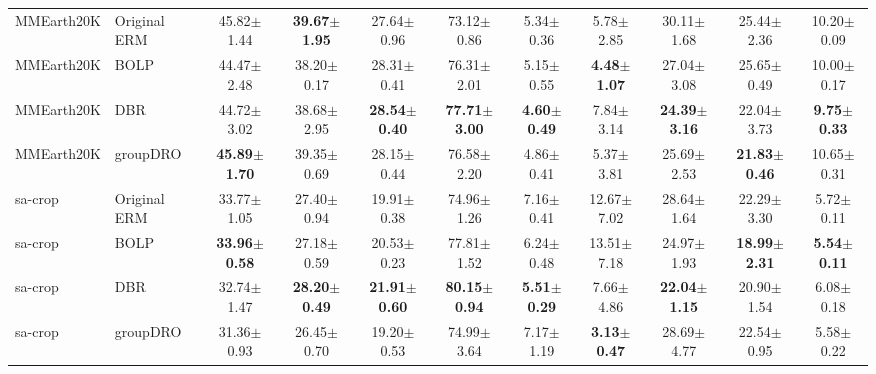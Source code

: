 \documentclass[11pt]{article}
\begin{document}
\begin{table}[h!]
{\begin{tabular}{llccccccccc}
MMEarth20K & Original ERM & 45.82$\pm$1.44 & \textbf{39.67$\pm$1.95} & 27.64$\pm$0.96 & 73.12$\pm$0.86 & 5.34$\pm$0.36 & 5.78$\pm$2.85 & 30.11$\pm$1.68 & 25.44$\pm$2.36 & 10.20$\pm$0.09 \\
MMEarth20K & BOLP & 44.47$\pm$2.48 & 38.20$\pm$0.17 & 28.31$\pm$0.41 & 76.31$\pm$2.01 & 5.15$\pm$0.55 & \textbf{4.48$\pm$1.07} & 27.04$\pm$3.08 & 25.65$\pm$0.49 & 10.00$\pm$0.17 \\
MMEarth20K & DBR & 44.72$\pm$3.02 & 38.68$\pm$2.95 & \textbf{28.54$\pm$0.40} & \textbf{77.71$\pm$3.00} & \textbf{4.60$\pm$0.49} & 7.84$\pm$3.14 & \textbf{24.39$\pm$3.16} & 22.04$\pm$3.73 & \textbf{9.75$\pm$0.33} \\
MMEarth20K & groupDRO & \textbf{45.89$\pm$1.70} & 39.35$\pm$0.69 & 28.15$\pm$0.44 & 76.58$\pm$2.20 & 4.86$\pm$0.41 & 5.37$\pm$3.81 & 25.69$\pm$2.53 & \textbf{21.83$\pm$0.46} & 10.65$\pm$0.31 \\
\midrule

sa-crop & Original ERM & 33.77$\pm$1.05 & 27.40$\pm$0.94 & 19.91$\pm$0.38 & 74.96$\pm$1.26 & 7.16$\pm$0.41 & 12.67$\pm$7.02 & 28.64$\pm$1.64 & 22.29$\pm$3.30 & 5.72$\pm$0.11 \\
sa-crop & BOLP & \textbf{33.96$\pm$0.58} & 27.18$\pm$0.59 & 20.53$\pm$0.23 & 77.81$\pm$1.52 & 6.24$\pm$0.48 & 13.51$\pm$7.18 & 24.97$\pm$1.93 & \textbf{18.99$\pm$2.31} & \textbf{5.54$\pm$0.11} \\
sa-crop & DBR & 32.74$\pm$1.47 & \textbf{28.20$\pm$0.49} & \textbf{21.91$\pm$0.60} & \textbf{80.15$\pm$0.94} & \textbf{5.51$\pm$0.29} & 7.66$\pm$4.86 & \textbf{22.04$\pm$1.15} & 20.90$\pm$1.54 & 6.08$\pm$0.18 \\
sa-crop & groupDRO & 31.36$\pm$0.93 & 26.45$\pm$0.70 & 19.20$\pm$0.53 & 74.99$\pm$3.64 & 7.17$\pm$1.19 & \textbf{3.13$\pm$0.47} & 28.69$\pm$4.77 & 22.54$\pm$0.95 & 5.58$\pm$0.22 \\
\bottomrule
\end{tabular}%
}
\end{table}



\end{document}
